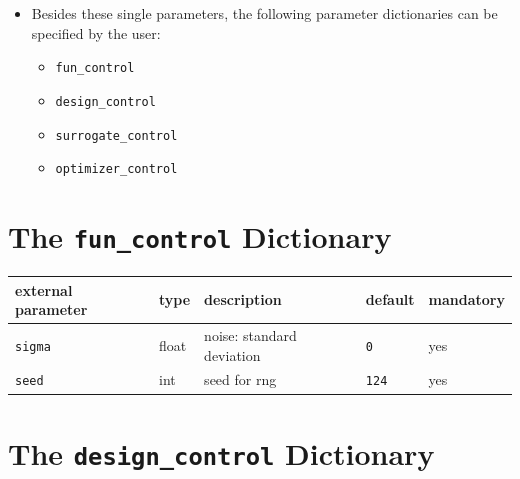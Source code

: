 \documentclass[
  letterpaper,
  DIV=11,
  numbers=noendperiod]{scrreprt}
\providecommand{\tightlist}{%
  \setlength{\itemsep}{0pt}\setlength{\parskip}{0pt}}\usepackage{longtable,booktabs,array}
\begin{document}
\begin{itemize}
\tightlist
\item
  Besides these single parameters, the following parameter dictionaries
  can be specified by the user:

  \begin{itemize}
  \tightlist
  \item
    \texttt{fun\_control}
  \item
    \texttt{design\_control}
  \item
    \texttt{surrogate\_control}
  \item
    \texttt{optimizer\_control}
  \end{itemize}
\end{itemize}

\section{\texorpdfstring{The \texttt{fun\_control}
Dictionary}{The fun\_control Dictionary}}\label{the-fun_control-dictionary}

\begin{longtable}[]{@{}lllll@{}}
\toprule\noalign{}
external parameter & type & description & default & mandatory \\
\midrule\noalign{}
\endhead
\bottomrule\noalign{}
\endlastfoot
\texttt{sigma} & float & noise: standard deviation & \texttt{0} & yes \\
\texttt{seed} & int & seed for rng & \texttt{124} & yes \\
\end{longtable}

\section{\texorpdfstring{The \texttt{design\_control}
Dictionary}{The design\_control Dictionary}}\label{the-design_control-dictionary}
\end{document}
